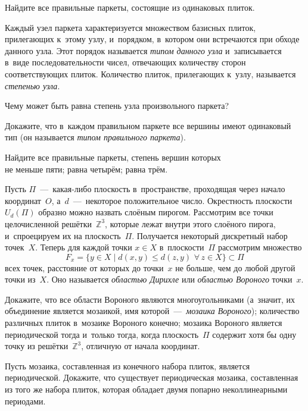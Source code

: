 \documentclass[a4paper,12pt]{article}
\begin{document}
Найдите все правильные паркеты, состоящие из одинаковых плиток.

Каждый узел паркета характеризуется множеством базисных плиток, прилегающих к~этому узлу, и~порядком, в~котором они встречаются при обходе данного узла. Этот порядок называется \emph{типом данного узла} и~записывается в~виде последовательности чисел, отвечающих количеству сторон соответствующих плиток. Количество плиток, прилегающих к~узлу, называется \emph{степенью узла}.

Чему может быть равна степень узла произвольного паркета?

Докажите, что в~каждом правильном паркете все вершины имеют одинаковый тип (он называется \emph{типом правильного паркета}).

Найдите все правильные паркеты, степень вершин которых\\
 не меньше пяти;
 равна четырём;
 равна трём.

Пусть $\Pi$~---~какая-либо плоскость в~пространстве, проходящая через начало координат~$O$, а~$d$~---~некоторое положительное число. Окрестность плоскости $U_{d}(\Pi)$ образно можно назвать  слоёным пирогом. Рассмотрим все точки целочисленной решётки~$\mathbb Z^3$, которые лежат внутри этого  слоёного пирога, и~спроецируем их на плоскость~$\Pi$. Получается некоторый дискретный набор точек~$X$. Теперь для каждой точки $x\in X$ в~плоскости~$\Pi$ рассмотрим множество
$$F_x=\{y\in X\mid d(x,y)\leqslant d(z,y)\,\,\forall\,z\in X\}\subset\Pi$$
всех точек, расстояние от которых до точки~$x$ не больше, чем до любой другой точки из~$X$. Оно называется \emph{областью Дирихле} или
\emph{областью Вороного} точки~$x$.

Докажите, что
 все области Вороного являются многоугольниками (а~значит, их объединение является мозаикой, имя которой~---~\emph{мозаика Вороного});
 количество различных плиток в~мозаике Вороного конечно;
 мозаика Вороного является периодической тогда и~только тогда, когда плоскость~$\Pi$ содержит хотя бы одну точку из решётки~$\mathbb Z^3$, отличную от начала координат.

 Пусть мозаика, составленная из конечного набора плиток, является периодической. Докажите, что существует периодическая мозаика, составленная из того же набора плиток, которая обладает двумя попарно неколлинеарными периодами.

\end{document}
